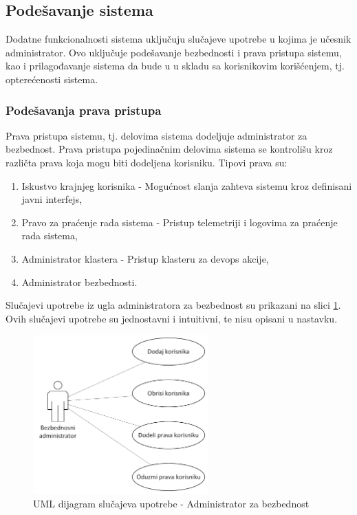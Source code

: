 \documentclass[12pt,oneside]{memoir}
\begin{document}
\subsection{Podešavanje sistema}
Dodatne funkcionalnosti sistema uključuju slučajeve upotrebe u kojima je učesnik administrator. Ovo uključuje podešavanje bezbednosti i prava pristupa sistemu, kao i prilagođavanje sistema da bude u u skladu sa korisnikovim korišćenjem, tj. opterećenosti sistema.


\subsubsection{Podešavanja prava pristupa}
Prava pristupa sistemu, tj. delovima sistema dodeljuje administrator za bezbednost. Prava pristupa pojedinačnim delovima sistema se kontrolišu kroz različta prava koja mogu biti dodeljena korisniku. Tipovi prava su:
	\begin{enumerate}
	\item Iskustvo krajnjeg korisnika - Mogućnost slanja zahteva sistemu kroz definisani javni interfejs,
	\item Pravo za praćenje rada sistema - Pristup telemetriji i logovima za praćenje rada sistema,
	\item Administrator klastera - Pristup klasteru za devops akcije,
	\item Administrator bezbednosti.
	\end{enumerate}
Slučajevi upotrebe iz ugla administratora za bezbednost su prikazani na slici \ref{fig:slucajupotrebe_aadadmin}. Ovih slučajevi upotrebe su jednostavni i intuitivni, te nisu opisani u nastavku.

\begin{figure}[!ht]
  \centering
  \includegraphics[width=0.6\textwidth]{./images/dijagram_slucajeva_upotrebe_administrator_sistema_aadadmin.png}
  \caption{UML dijagram slučajeva upotrebe - Administrator za bezbednost}
  \label{fig:slucajupotrebe_aadadmin}
\end{figure}
\end{document}
